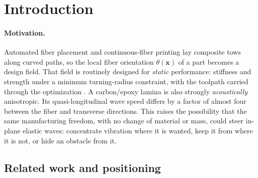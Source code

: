 \section{Introduction}\label{sec:intro}

\paragraph{Motivation.} Automated fiber placement and continuous-fiber printing lay
composite tows along curved paths, so the local fiber orientation $\theta(\bm x)$ of a
part becomes a design field. That field is routinely designed for \emph{static}
performance: stiffness and strength under a minimum turning-radius constraint, with the
toolpath carried through the optimization \cite{wong2025}. A carbon/epoxy lamina is
also strongly \emph{acoustically} anisotropic. Its quasi-longitudinal wave speed
differs by a factor of almost four between the fiber and transverse directions. This
raises the possibility that the same manufacturing freedom, with no change of material
or mass, could steer in-plane elastic waves: concentrate vibration where it is wanted,
keep it from where it is not, or hide an obstacle from it.

\subsection{Related work and positioning}\label{sec:related}
